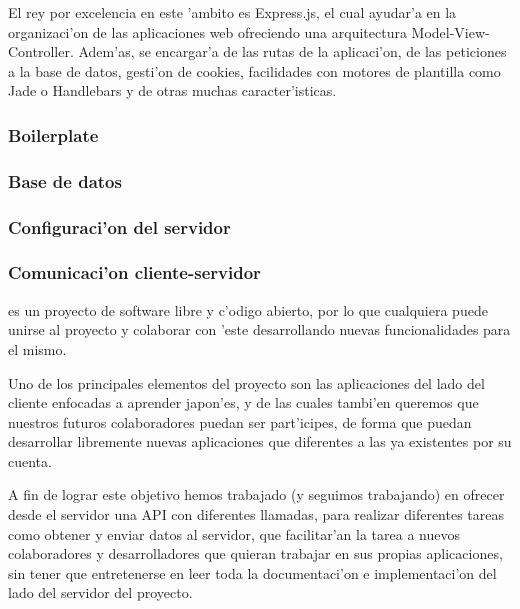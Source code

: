 El rey por excelencia en este 'ambito es Express.js, el cual ayudar'a en la organizaci'on de las aplicaciones web ofreciendo una arquitectura
Model-View-Controller. Adem'as, se encargar'a de las rutas de la aplicaci'on, de las peticiones a la base de datos, gesti'on de cookies,
facilidades con motores de plantilla como Jade o Handlebars y de otras muchas caracter'isticas.

\subsubsection{Boilerplate}
\label{sub:boilerplate}

\subsubsection{Base de datos}
\label{sub:base_de_datos}

\subsubsection{Configuraci'on del servidor}
\label{sub:configuracion_del_servidor}

\subsubsection{Comunicaci'on cliente-servidor}
\label{sub:comunicacion_cliente_servidor}

\Nipponline{} es un proyecto de software libre y c'odigo abierto, por lo que cualquiera puede unirse al proyecto y
colaborar con 'este desarrollando nuevas funcionalidades para el mismo.

Uno de los principales elementos del proyecto son las aplicaciones del lado del cliente enfocadas a aprender
japon'es, y de las cuales tambi'en queremos que nuestros futuros colaboradores puedan ser part'icipes, de forma que
puedan desarrollar libremente nuevas aplicaciones que diferentes a las ya existentes por su cuenta.

A fin de lograr este objetivo hemos trabajado (y seguimos trabajando) en ofrecer desde el servidor una API con
diferentes llamadas, para realizar diferentes tareas como obtener y enviar datos al servidor, que facilitar'an la
tarea a nuevos colaboradores y desarrolladores que quieran trabajar en sus propias aplicaciones, sin tener que
entretenerse en leer toda la documentaci'on e implementaci'on del lado del servidor del proyecto.

